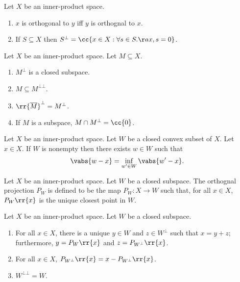 \documentclass{article}
\begin{document}
\begin{lemma}
  Let $X$ be an inner-product space.
  \begin{enumerate}
    \item $x$ is orthogonal to $y$ iff $y$ is orthognal to $x$.
    \item If $S\subseteq X$ then $S^\bot=\cc{x\in X : \forall s\in S. \aa{x,s}=0 }$.
  \end{enumerate}
\end{lemma}

\begin{lemma}
  Let $X$ be an inner-product space. Let $M\subseteq X$.
  \begin{enumerate}
    \item $M^\bot$ is a closed subspace.
    \item $M\subseteq M^{\bot\bot}$.
    \item $\rr{\overline{M}}^\bot=M^\bot$.
    \item If $M$ is a subspace, $M\cap M^\bot = \cc{0}$.
  \end{enumerate}
\end{lemma}

\begin{theorem}
  Let $X$ be an inner-product space. Let $W$ be a closed convex subset of $X$. Let
  $x\in X$. If $W$ is nonempty then there exists $w\in W$ such that
  \begin{align*}
    \vabs{w-x}=\inf_{w'\in W}\vabs{w'-x}.
  \end{align*}
\end{theorem}

\begin{definition}\label{def:orthogonal-projection}
  Let $X$ be an inner-product space. Let $W$ be a closed subspace. The orthognal projection
  $P_W$ is defined to be the map $P_W:X\to W$ such that, for all $x\in X$, $P_W\rr{x}$
  is the unique closest point in $W$.
\end{definition}

\begin{theorem}
  Let $X$ be an inner-product space. Let $W$ be a closed subspace.
  \begin{enumerate}
    \item For all $x\in X$, there is a unique $y\in W$ and $z\in W^\bot$ such that
      $x=y+z$; furthermore, $y=P_W\rr{x}$ and $z=P_{W^\bot}\rr{x}$.
    \item For all $x\in X$, $P_{W^\bot}\rr{x}=x-P_{W^\bot}\rr{x}$.
    \item $W^{\bot\bot}=W$.
  \end{enumerate}
\end{theorem}
\end{document}

